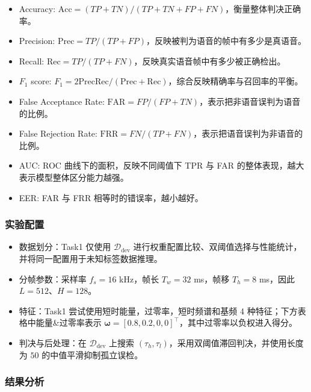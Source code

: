 \documentclass[a4paper]{article}
\begin{document}
\begin{itemize}
  \item Accuracy: $\mathrm{Acc}=(TP+TN)/(TP+TN+FP+FN)$，衡量整体判决正确率。
  \item Precision: $\mathrm{Prec}=TP/(TP+FP)$，反映被判为语音的帧中有多少是真语音。
  \item Recall: $\mathrm{Rec}=TP/(TP+FN)$，反映真实语音帧中有多少被正确检出。
  \item $F_1$ score: $F_1=2\mathrm{Prec}\mathrm{Rec}/(\mathrm{Prec}+\mathrm{Rec})$，综合反映精确率与召回率的平衡。
  \item False Acceptance Rate: $\mathrm{FAR}=FP/(FP+TN)$，表示把非语音误判为语音的比例。
  \item False Rejection Rate: $\mathrm{FRR}=FN/(TP+FN)$，表示把语音误判为非语音的比例。
  \item AUC: ROC 曲线下的面积，反映不同阈值下 TPR 与 FAR 的整体表现，越大表示模型整体区分能力越强。
  \item EER: FAR 与 FRR 相等时的错误率，越小越好。
\end{itemize}

\subsubsection{实验配置}

\begin{itemize}
  \item 数据划分：Task1 仅使用 $\mathcal{D}_{\text{dev}}$ 进行权重配置比较、双阈值选择与性能统计，并将同一配置用于未知标签数据推理。
  \item 分帧参数：采样率 $f_s=16$ kHz，帧长 $T_w=32$ ms，帧移 $T_h=8$ ms，因此 $L=512$、$H=128$。
  \item 特征：Task1 尝试使用短时能量，过零率，短时频谱和基频 4 种特征；下方表格中能量\&过零率表示 $\boldsymbol{\omega}=[0.8,0.2,0,0]^\top$，其中过零率以负权进入得分。
  \item 判决与后处理：在 $\mathcal{D}_{\text{dev}}$ 上搜索 $(\tau_h,\tau_l)$，采用双阈值滞回判决，并使用长度为 $50$ 的中值平滑抑制孤立误检。
\end{itemize}

\subsubsection{结果分析}
\end{document}
